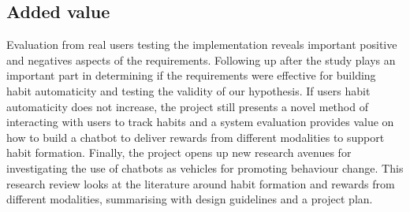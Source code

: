 \subsection*{Added value}
Evaluation from real users testing the implementation reveals important positive and negatives aspects of the requirements. Following up after the study plays an important part in determining if the requirements were effective for building habit automaticity and testing the validity of our hypothesis. If users habit automaticity does not increase, the project still presents a novel method of interacting with users to track habits and a system evaluation provides value on how to build a chatbot to deliver rewards from different modalities to support habit formation. Finally, the project opens up new research avenues for investigating the use of chatbots as vehicles for promoting behaviour change.\newline
\newline
This research review looks at the literature around habit formation and rewards from different modalities, summarising with design guidelines and a project plan.

\newpage

